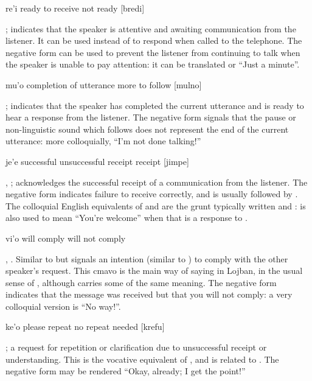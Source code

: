    re'i    ready to receive        not ready
            [bredi]

; indicates that the speaker is
    attentive and awaiting communication from the listener. It can
    be used instead of  to respond when called to the
    telephone. The negative form can be used to prevent the
    listener from continuing to talk when the speaker is unable to
    pay attention: it can be translated  or ``Just a
    minute''. 

   mu'o    completion of utterance     more to follow
            [mulno]

; indicates that the speaker has completed the
    current utterance and is ready to hear a response from the
    listener. The negative form signals that the pause or
    non-linguistic sound which follows does not represent the end
    of the current utterance: more colloquially, ``I'm not done
    talking!'' 

   je'e    successful          unsuccessful
         receipt            receipt
            [jimpe]

, ; acknowledges the successful
    receipt of a communication from the listener. The negative form
    indicates failure to receive correctly, and is usually followed
    by . The colloquial English equivalents of  and
     are the grunt typically written  and
    :  is also used to mean ``You're
    welcome'' when that is a response to . 

   vi'o    will comply         will not comply

, . Similar to
     but signals an intention (similar to ) to
    comply with the other speaker's request. This cmavo is the main
    way of saying  in Lojban, in the usual sense of
    , although  carries some of the same meaning.
    The negative form indicates that the message was received but
    that you will not comply: a very colloquial version is ``No
    way!''. 

   ke'o    please repeat           no repeat needed
            [krefu]

; a request for repetition or
    clarification due to unsuccessful receipt or understanding.
    This is the vocative equivalent of , and is related to
    . The negative form may be rendered ``Okay, already;
    I get the point!'' 


